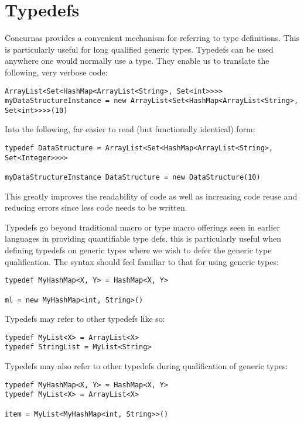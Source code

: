 \documentclass[conc-doc]{subfiles}
\begin{document}
	
	\chapter[Typedefs]{Typedefs}
	\label{chap:typedefs}
	
Concurnas provides a convenient mechanism for referring to type definitions. This is particularly useful for long qualified generic types. Typedefs can be used anywhere one would normally use a type. They enable us to translate the following, very verbose code:
\begin{lstlisting}
ArrayList<Set<HashMap<ArrayList<String>, Set<int>>>> myDataStructureInstance = new ArrayList<Set<HashMap<ArrayList<String>, Set<int>>>>(10)
\end{lstlisting}
Into the following, far easier to read (but functionally identical) form:
\begin{lstlisting}
typedef DataStructure = ArrayList<Set<HashMap<ArrayList<String>, Set<Integer>>>>

myDataStructureInstance DataStructure = new DataStructure(10)
\end{lstlisting}

This greatly improves the readability of code as well as increasing code reuse and reducing errors since less code needs to be written.

Typedefs go beyond traditional macro or type macro offerings seen in earlier languages in providing quantifiable type defs, this is particularly useful when defining typedefs on generic types where we wish to defer the generic type qualification. The syntax should feel familiar to that for using generic types: 
\begin{lstlisting}
typedef MyHashMap<X, Y> = HashMap<X, Y>

ml = new MyHashMap<int, String>()
\end{lstlisting}

Typedefs may refer to other typedefs like so:
\begin{lstlisting}
typedef MyList<X> = ArrayList<X>
typedef StringList = MyList<String>
\end{lstlisting}

Typedefs may also refer to other typedefs during qualification of generic types:
\begin{lstlisting}
typedef MyHashMap<X, Y> = HashMap<X, Y>
typedef MyList<X> = ArrayList<X>

item = MyList<MyHashMap<int, String>>()
\end{lstlisting}
\end{document}
